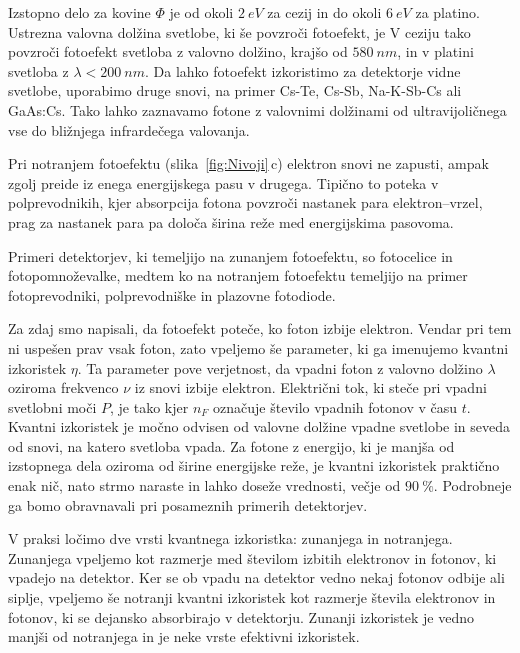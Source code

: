 Izstopno delo za kovine $\Phi$ je od okoli $2~\si{eV}$ za cezij in do okoli 
$6~\si{eV}$ za platino. 
Ustrezna valovna dolžina svetlobe, ki še povzroči fotoefekt, je 
V ceziju tako povzroči fotoefekt svetloba z valovno dolžino, krajšo od $580~\si{nm}$, in
v platini svetloba z $\lambda < 200~\si{nm}$. 
Da lahko fotoefekt izkoristimo za detektorje vidne svetlobe, 
uporabimo druge snovi, na primer Cs-Te, Cs-Sb, Na-K-Sb-Cs ali GaAs:Cs. 
Tako lahko zaznavamo fotone z valovnimi dolžinami od ultravijoličnega
vse do bližnjega infrardečega valovanja.

Pri notranjem fotoefektu (slika~\ref{fig:Nivoji}\,c) elektron 
snovi ne zapusti, ampak zgolj preide iz enega 
energijskega pasu v drugega. Tipično to poteka v polprevodnikih, kjer absorpcija fotona 
povzroči nastanek para elektron--vrzel, prag za nastanek para pa določa širina reže med 
energijskima pasovoma. 

Primeri detektorjev, ki temeljijo na zunanjem fotoefektu, so 
fotocelice in foto\-pomnoževalke, medtem ko na notranjem fotoefektu temeljijo na primer
fotoprevodniki, polprevodniške in plazovne fotodiode.

Za zdaj smo napisali, da fotoefekt poteče, ko foton izbije elektron. Vendar pri tem ni 
uspešen prav vsak foton, zato vpeljemo še parameter, ki ga imenujemo 
kvantni izkoristek $\eta$.
Ta parameter pove verjetnost, da vpadni foton z valovno dolžino $\lambda$ 
oziroma frekvenco $\nu$ iz snovi izbije elektron. 
Električni tok, ki steče pri vpadni svetlobni moči $P$, je tako
kjer $n_F$ označuje število vpadnih fotonov v času $t$. 
Kvantni izkoristek je močno odvisen od valovne dolžine vpadne svetlobe in seveda
od snovi, na katero svetloba vpada. Za fotone z energijo, ki je manjša od izstopnega 
dela oziroma od širine energijske reže, je kvantni izkoristek praktično enak nič, 
nato strmo naraste in lahko doseže vrednosti, večje od $90~\%$. Podrobneje ga bomo 
obravnavali pri posameznih primerih detektorjev.

\begin{remark}
V praksi ločimo dve vrsti kvantnega izkoristka: zunanjega in notranjega. Zunanjega vpeljemo kot 
razmerje med številom izbitih elektronov in fotonov, ki vpadejo na detektor. Ker se 
ob vpadu na detektor vedno nekaj fotonov odbije ali siplje, vpeljemo še notranji kvantni 
izkoristek kot razmerje števila elektronov in fotonov, ki se dejansko absorbirajo v detektorju.
Zunanji izkoristek je vedno manjši od notranjega in je neke vrste efektivni 
izkoristek.
\end{remark}

